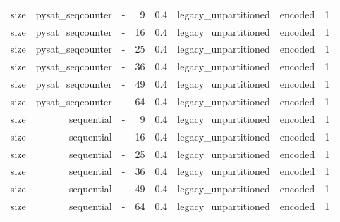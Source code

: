 \begin{tabular}{lrrrrrrr}
size & pysat\_seqcounter & - & 9 & 0.4 & legacy\_unpartitioned & encoded & 1 \\
size & pysat\_seqcounter & - & 16 & 0.4 & legacy\_unpartitioned & encoded & 1 \\
size & pysat\_seqcounter & - & 25 & 0.4 & legacy\_unpartitioned & encoded & 1 \\
size & pysat\_seqcounter & - & 36 & 0.4 & legacy\_unpartitioned & encoded & 1 \\
size & pysat\_seqcounter & - & 49 & 0.4 & legacy\_unpartitioned & encoded & 1 \\
size & pysat\_seqcounter & - & 64 & 0.4 & legacy\_unpartitioned & encoded & 1 \\
size & sequential & - & 9 & 0.4 & legacy\_unpartitioned & encoded & 1 \\
size & sequential & - & 16 & 0.4 & legacy\_unpartitioned & encoded & 1 \\
size & sequential & - & 25 & 0.4 & legacy\_unpartitioned & encoded & 1 \\
size & sequential & - & 36 & 0.4 & legacy\_unpartitioned & encoded & 1 \\
size & sequential & - & 49 & 0.4 & legacy\_unpartitioned & encoded & 1 \\
size & sequential & - & 64 & 0.4 & legacy\_unpartitioned & encoded & 1 \\
\bottomrule
\end{tabular}
